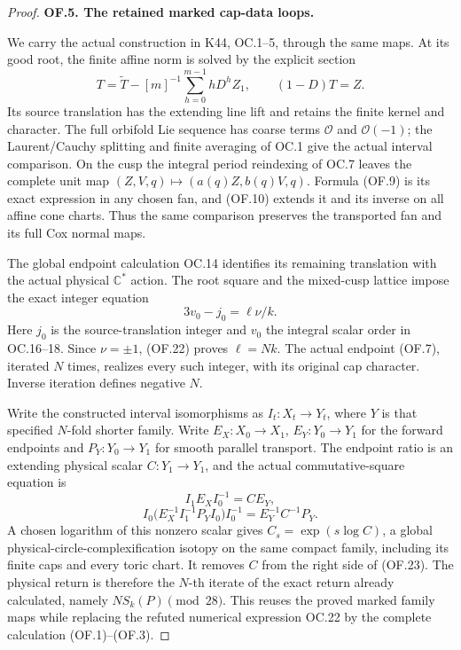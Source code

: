 \begin{proof}
\par\medskip\noindent\textbf{OF.5. The retained marked cap-data loops.}\par\nopagebreak[4]
We carry the actual construction in K44, OC.1--5, through
the same maps. At its good root, the finite affine norm
is solved by the explicit section
\[
 T=\widetilde T-[m]^{-1}\sum_{h=0}^{m-1}hD^hZ_1,
 \qquad (1-D)T=Z.
\]
Its source translation has the extending line lift and
retains the finite kernel and character. The full
orbifold Lie sequence has coarse terms \(\mathcal O\)
and \(\mathcal O(-1)\); the Laurent/Cauchy splitting
and finite averaging of OC.1 give the actual interval
comparison. On the cusp the integral period reindexing
of OC.7 leaves the complete unit map
\((Z,V,q)\mapsto(a(q)Z,b(q)V,q)\). Formula (OF.9)
is its exact expression in any chosen fan, and (OF.10)
extends it and its inverse on all affine cone charts.
Thus the same comparison preserves the transported
fan and its full Cox normal maps.

The global endpoint calculation OC.14 identifies its
remaining translation with the actual physical
\(\mathbb C^*\) action. The root square and the
mixed-cusp lattice impose the exact integer equation
\[
                         3v_0-j_0=\ell\nu/k.
 \tag{OF.22}
\]
Here \(j_0\) is the source-translation integer and
\(v_0\) the integral scalar order in OC.16--18.
Since \(\nu=\pm1\), (OF.22) proves \(\ell=Nk\).
The actual endpoint (OF.7), iterated \(N\) times,
realizes every such integer, with its original cap
character. Inverse iteration defines negative \(N\).

Write the constructed interval isomorphisms as
\(I_t:X_t\to Y_t\), where \(Y\) is that specified
\(N\)-fold shorter family. Write
\(E_X:X_0\to X_1\), \(E_Y:Y_0\to Y_1\) for the
forward endpoints and \(P_Y:Y_0\to Y_1\) for smooth
parallel transport. The endpoint ratio is an extending
physical scalar \(C:Y_1\to Y_1\), and the actual
commutative-square equation is
\[
 I_1E_XI_0^{-1}=CE_Y,
\]
\[
 I_0\bigl(E_X^{-1}I_1^{-1}P_YI_0\bigr)I_0^{-1}
                         =E_Y^{-1}C^{-1}P_Y.            \tag{OF.23}
\]
A chosen logarithm of this nonzero scalar gives
\(C_s=\exp(s\log C)\), a global physical-circle-complexification
isotopy on the same compact family, including its
finite caps and every toric chart. It removes \(C\)
from the right side of (OF.23). The physical return
is therefore the \(N\)-th iterate of the exact return
already calculated, namely \(N S_k(P)\pmod {28}\).
This reuses the proved marked family maps while
replacing the refuted numerical expression OC.22 by
the complete calculation (OF.1)--(OF.3).
\end{proof}

